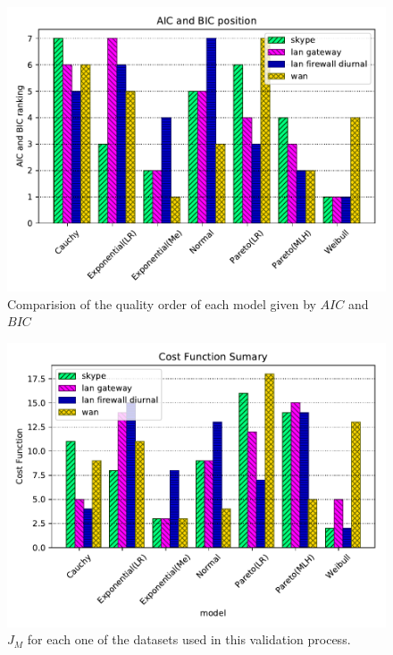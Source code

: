 \begin{figure}[!ht]
    \centering
    \includegraphics[scale=0.8]{figures/ch4/aic-bic-order}
    \caption{Comparision of the quality order of each model given by $AIC$ and $BIC$}
    \label{fig:aic-bic-order}
\end{figure}


\begin{figure}[ht!]
\includegraphics[scale=0.8]{figures/ch4/cost-function-summary}
\caption{$J_M$ for each one of the datasets used in this validation process.}
\label{fig:model-order-cost}
\end{figure}

